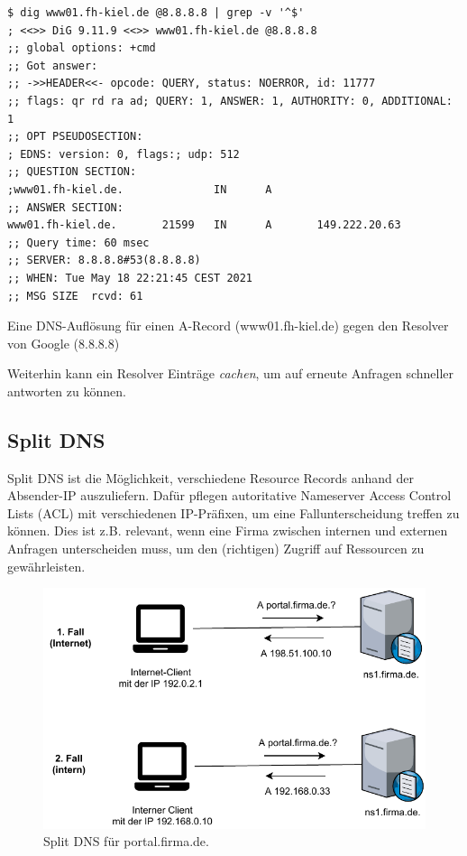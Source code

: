 \begin{listing}[h]
\begin{verbatim}
$ dig www01.fh-kiel.de @8.8.8.8 | grep -v '^$'
; <<>> DiG 9.11.9 <<>> www01.fh-kiel.de @8.8.8.8
;; global options: +cmd
;; Got answer:
;; ->>HEADER<<- opcode: QUERY, status: NOERROR, id: 11777
;; flags: qr rd ra ad; QUERY: 1, ANSWER: 1, AUTHORITY: 0, ADDITIONAL: 1
;; OPT PSEUDOSECTION:
; EDNS: version: 0, flags:; udp: 512
;; QUESTION SECTION:
;www01.fh-kiel.de.              IN      A
;; ANSWER SECTION:
www01.fh-kiel.de.       21599   IN      A       149.222.20.63
;; Query time: 60 msec
;; SERVER: 8.8.8.8#53(8.8.8.8)
;; WHEN: Tue May 18 22:21:45 CEST 2021
;; MSG SIZE  rcvd: 61
\end{verbatim}
\label{dig-example-fh-kiel}
\caption{Eine DNS-Auflösung für einen A-Record (www01.fh-kiel.de) gegen den Resolver von Google (8.8.8.8)}
\end{listing}



Weiterhin kann ein Resolver Einträge \textit{cachen}, um auf erneute Anfragen schneller antworten zu können.%

\subsection{Split DNS}
Split DNS ist die Möglichkeit, verschiedene Resource Records anhand der Absender-IP auszuliefern. Dafür pflegen autoritative Nameserver Access Control Lists (ACL) mit verschiedenen IP-Präfixen, um eine Fallunterscheidung treffen zu können. Dies ist z.B. relevant, wenn eine Firma zwischen internen und externen Anfragen unterscheiden muss, um den (richtigen) Zugriff auf Ressourcen zu gewährleisten.

\begin{figure}[h]
  \centering
  \includegraphics{Figures/dns_split_view.pdf}
  \caption{Split DNS für portal.firma.de.}
  \label{grafik: split-dns}
\end{figure}\FloatBarrier

